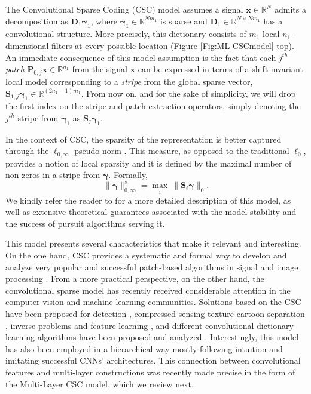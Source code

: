 \documentclass[10pt,journal]{IEEEtran}
\def\x{{\mathbf x}}
\def\D{{\mathbf D}}
\def\gama{{\boldsymbol \gamma}}
\def\Loi{{\ell_{0,\infty}}}
\theoremstyle{plain}
\theoremstyle{definition}
\begin{document}
The Convolutional Sparse Coding (CSC) model assumes a signal $\x \in \mathbb{R}^N$ admits a decomposition as $\D_1\gama_1$, where $\gama_1 \in \mathbb{R}^{Nm_1}$ is sparse and $\D_1 \in \mathbb{R}^{N\times Nm_1}$ has a convolutional structure. More precisely, this dictionary consists of $m_1$ local $n_1$-dimensional filters at every possible location (Figure \ref{Fig:ML-CSCmodel} top).
An immediate consequence of this model assumption is the fact that each $j^{th}$ \emph{patch} $\mathbf{P}_{0,j}\x \in \mathbb{R}^{n_1}$ from the signal $\x$ can be expressed in terms of a shift-invariant local model corresponding to a \emph{stripe} from the global sparse vector, $\mathbf{S}_{1,j}\gama_1 \in \mathbb{R}^{(2n_1-1)m_1}$. From now on, and for the sake of simplicity, we will drop the first index on the stripe and patch extraction operators, simply denoting the $j^{th}$ stripe from $\gama_1$ as $\mathbf{S}_j\gama_1$. 

In the context of CSC, the sparsity of the representation is better captured through the $\Loi$ pseudo-norm \cite{WorkingLocallyThinkingGlobally}. This measure, as opposed to the traditional $\ell_0$, provides a notion of local sparsity and it is defined by the maximal number of non-zeros in a stripe from $\gama$. Formally,
\begin{equation}
	\|\gama\|^s_{0,\infty} = \underset{i}{\max}\ \| \mathbf{S}_i \gama \|_0.
\end{equation}
We kindly refer the reader to \cite{WorkingLocallyThinkingGlobally} for a more detailed description of this model, as well as extensive theoretical guarantees associated with the model stability and the success of pursuit algorithms serving it. 

This model presents several characteristics that make it relevant and interesting. On the one hand, CSC provides a systematic and formal way to develop and analyze very popular and successful patch-based algorithms in signal and image processing \cite{WorkingLocallyThinkingGlobally}. From a more practical perspective, on the other hand, the convolutional sparse model has recently received considerable attention in the computer vision and machine learning communities. Solutions based on the CSC have been proposed for detection \cite{sermanet2013pedestrian}, compressed sensing \cite{li2013convolutional} texture-cartoon separation \cite{zhang2016convolutional,zhang2018convolutional}, inverse problems \cite{Papyan_2017_ICCV,Heide2015,choudhury2017consensus} and feature learning \cite{henaff2011unsupervised,szlam2011structured}, and different convolutional dictionary learning algorithms have been proposed and analyzed \cite{Papyan_2017_ICCV,Wohlberg2016,liu2017online}. Interestingly, this model has also been employed in a hierarchical way \cite{zeiler2010deconvolutional,szlam2010convolutional,kavukcuoglu2010learning,he2014unsupervised} mostly following intuition and imitating successful CNNs' architectures. This connection between convolutional features and multi-layer constructions was recently made precise in the form of the Multi-Layer CSC model, which we review next.
\end{document}
